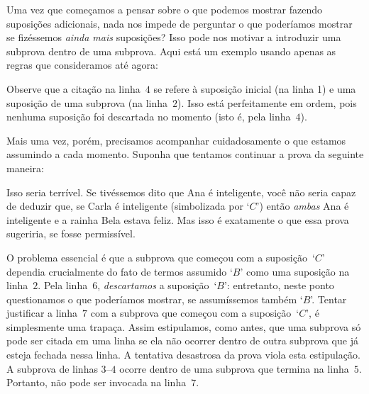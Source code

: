 Uma vez que come\c camos a pensar sobre o que podemos mostrar fazendo suposi\c c\~oes adicionais, nada nos impede de perguntar  o que poder\'iamos mostrar se fiz\'essemos  \emph{ainda mais}  suposi\c c\~oes?  Isso pode nos motivar a introduzir uma subprova dentro de uma subprova.  Aqui est\'a um exemplo usando apenas as regras que consideramos at\'e agora:


\begin{fitchproof}
\open
	\open
	\close
\close
{}
\end{fitchproof}
 Observe que a cita\c c\~ao na linha~$4$ se refere \`a suposi\c c\~ao inicial (na linha 1) e uma suposi\c c\~ao de uma subprova (na linha~$2$). Isso est\'a perfeitamente em ordem, pois nenhuma suposi\c c\~ao foi descartada no momento (isto \'e, pela linha~$4$).  

Mais uma vez, por\'em, precisamos acompanhar cuidadosamente o que estamos assumindo a cada momento. Suponha que tentamos continuar a prova da seguinte maneira:
\begin{fitchproof}
\open
	\open
	\close
\close
{}
 
\end{fitchproof}
 Isso seria terr\'ivel. Se tiv\'essemos dito  que Ana \'e inteligente, voc\^e n\~ao seria capaz de deduzir que, se Carla \'e inteligente (simbolizada por  `$C$') ent\~ao \emph{ambas} Ana \'e inteligente  e a rainha Bela estava feliz. Mas isso \'e exatamente o que essa prova sugeriria, se fosse permiss\'ivel.

O problema essencial \'e que a subprova que come\c cou com a suposi\c c\~ao~`$C$' dependia crucialmente do fato de termos assumido `$B$' como uma suposi\c c\~ao na linha~$2$.  Pela linha~$6$, \emph{descartamos} a suposi\c c\~ao~`$B$': entretanto,  neste ponto questionamos  o que poder\'iamos mostrar, se assum\'issemos tamb\'em `$B$'. Tentar justificar a linha~$7$ com a subprova que come\c cou com a suposi\c c\~ao~`$C$', \'e simplesmente uma trapa\c ca.  Assim estipulamos, como antes, que uma subprova s\'o pode ser citada em uma linha se ela n\~ao ocorrer dentro de outra subprova que j\'a esteja fechada nessa linha. A tentativa desastrosa da prova viola esta estipula\c c\~ao.  A subprova de linhas $3$--$4$ ocorre dentro de uma subprova que termina na linha~$5$. Portanto, n\~ao pode ser invocada na linha~$7$.


